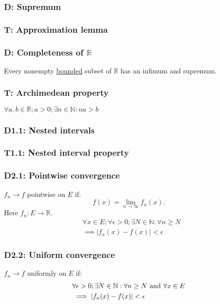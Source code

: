 \documentclass{article}
\begin{document}
\begin{multicols*}{3}
\noindent

\subsubsection*{D: Supremum}

\subsubsection*{T: Approximation lemma}

\subsubsection*{D: Completeness of $\mathbb{R}$}
Every nonempty \underline{bounded} subset
of $\mathbb{R}$ has an infimum and supremum.

\subsubsection*{T: Archimedean property}
$\forall a,b\in\mathbb{R}; a>0;\exists n\in\mathbb{N}
: na>b$

\subsubsection*{D1.1: Nested intervals}

\subsubsection*{T1.1: Nested interval property}

\subsubsection*{D2.1: Pointwise convergence}
$f_n\rightarrow f$ pointwise on $E$ if:
$$f(x)=\lim_{n\rightarrow\infty}f_n(x).$$
Here $f_n:E\rightarrow\mathbb{R}$.
\begin{align*}
    &\forall x\in E;\forall\epsilon>0;
    \exists N\in\mathbb{N}:\forall n\geq N \\
    &\implies |f_n(x)-f(x)|<\epsilon
\end{align*}

\subsubsection*{D2.2: Uniform convergence}
$f_n\rightarrow f$ uniformly on $E$ if:
\begin{align*}
    &\forall\epsilon>0;
    \exists N\in\mathbb{N}:\forall n\geq N
    \hspace{0.05in}\text{and}\hspace{0.05in}
    \forall x\in E \\
    &\implies |f_n(x)-f(x)|<\epsilon
\end{align*}


\end{multicols*}
\end{document}
